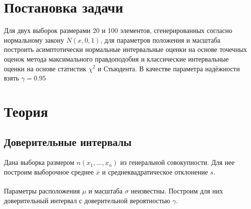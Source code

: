 \documentclass[12pt]{article}
\begin{document}
\begin{flushleft}

\setlength{\parindent}{1cm}

\tableofcontents

\newpage

\listoftables

\newpage

\section{Постановка задачи}

Для двух выборок размерами 20 и 100 элементов, сгенерированных согласно нормальному закону $N(x,0,1)$, для параметров положения и масштаба построить асимптотически нормальные интервальные оценки на основе точечных оценок метода максимального правдоподобия и классические интервальные оценки на основе статистик $\chi^2$ и Стьюдента. В качестве параметра надёжности взять $\gamma = 0.95$

\newpage

\section{Теория}

	\subsection{Доверительные интервалы}
		Дана выборка размером $n (x_1,\dots,x_n)$ из генеральной совокупности. Для нее построим выборочное среднее $\overline{x}$ и среднеквадратическое отклонение $s$.\cite{theory}\\
		\phantom{0}\\
		Параметры расположения $\mu$ и масштаба $\sigma$ неизвестны. Построим для них доверительный интервал с доверительной вероятностью $\gamma$.


\end{flushleft}
\end{document}
